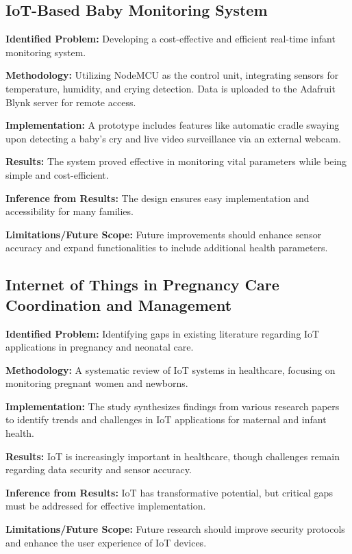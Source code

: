 \documentclass[conference]{IEEEtran}
\begin{document}
\subsection{IoT-Based Baby Monitoring System}
\textbf{Identified Problem:} Developing a cost-effective and efficient real-time infant monitoring system.

\textbf{Methodology:} Utilizing NodeMCU as the control unit, integrating sensors for temperature, humidity, and crying detection. Data is uploaded to the Adafruit Blynk server for remote access.

\textbf{Implementation:} A prototype includes features like automatic cradle swaying upon detecting a baby’s cry and live video surveillance via an external webcam.

\textbf{Results:} The system proved effective in monitoring vital parameters while being simple and cost-efficient.

\textbf{Inference from Results:} The design ensures easy implementation and accessibility for many families.

\textbf{Limitations/Future Scope:} Future improvements should enhance sensor accuracy and expand functionalities to include additional health parameters.

\subsection{Internet of Things in Pregnancy Care Coordination and Management}
\textbf{Identified Problem:} Identifying gaps in existing literature regarding IoT applications in pregnancy and neonatal care.

\textbf{Methodology:} A systematic review of IoT systems in healthcare, focusing on monitoring pregnant women and newborns.

\textbf{Implementation:} The study synthesizes findings from various research papers to identify trends and challenges in IoT applications for maternal and infant health.

\textbf{Results:} IoT is increasingly important in healthcare, though challenges remain regarding data security and sensor accuracy.

\textbf{Inference from Results:} IoT has transformative potential, but critical gaps must be addressed for effective implementation.

\textbf{Limitations/Future Scope:} Future research should improve security protocols and enhance the user experience of IoT devices.
\end{document}
